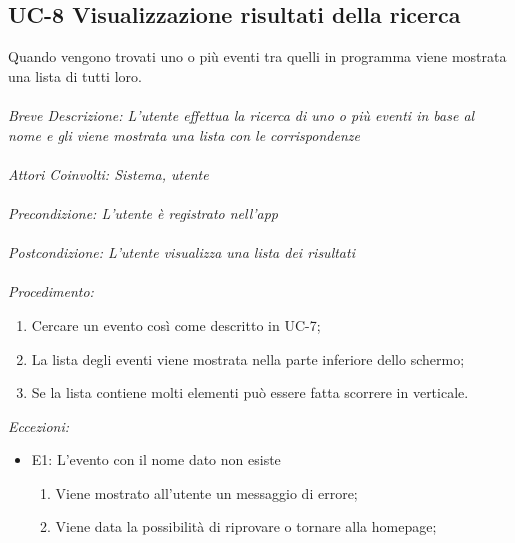 \subsection{UC-8 Visualizzazione risultati della ricerca}
Quando vengono trovati uno o più eventi tra quelli in programma viene mostrata una lista di tutti loro.
\\
\\
\textit{Breve Descrizione: L'utente effettua la ricerca di uno o più eventi in base al nome e gli viene mostrata una lista con le corrispondenze} 
\\
\\
\textit{Attori Coinvolti: Sistema, utente}
\\
\\
\textit{Precondizione: L'utente è registrato nell'app}
\\
\\
\textit{Postcondizione: L'utente visualizza una lista dei risultati}
\\
\\
\textit{Procedimento:}
\begin{enumerate}
	\item Cercare un evento così come descritto in UC-7;
	\item La lista degli eventi viene mostrata nella parte inferiore dello schermo;
	\item Se la lista contiene molti elementi può essere fatta scorrere in verticale.
\end{enumerate}


\textit{Eccezioni:}
\begin{itemize}
	\item E1: L'evento con il nome dato non esiste
	\begin{enumerate}
		\item Viene mostrato all'utente un messaggio di errore;
		\item Viene data la possibilità di riprovare o tornare alla homepage;
	\end{enumerate}
\end{itemize}